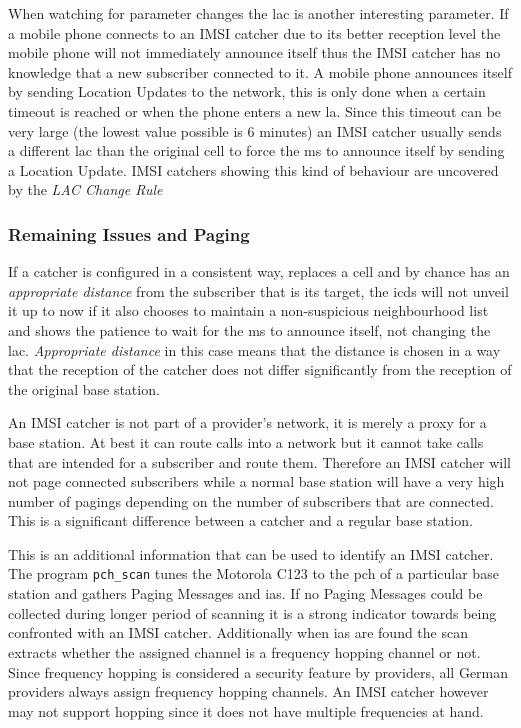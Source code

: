 When watching for parameter changes the \gls{lac} is another interesting parameter.
If a mobile phone connects to an IMSI catcher due to its better reception level the mobile phone will not immediately announce itself thus the IMSI catcher has no knowledge that a new subscriber connected to it.
A mobile phone announces itself by sending Location Updates to the network, this is only done when a certain timeout is reached or when the phone enters a new \gls{la}.
Since this timeout can be very large (the lowest value possible is 6 minutes) an IMSI catcher usually sends a different \gls{lac} than the original cell to force the \gls{ms} to announce itself by sending a Location Update.
IMSI catchers showing this kind of behaviour are uncovered by the \emph{LAC Change Rule}

\subsubsection{Remaining Issues and Paging}
\label{sec:paging}
If a catcher is configured in a consistent way, replaces a cell and by chance has an \emph{appropriate distance} from the subscriber that is its target, the \gls{icds} will not unveil it up to now if it also chooses to maintain a non-suspicious neighbourhood list and shows the patience to wait for the \gls{ms} to announce itself, \eg not changing the \gls{lac}.
\emph{Appropriate distance} in this case means that the distance is chosen in a way that the reception of the catcher does not differ significantly from the reception of the original base station.

An IMSI catcher is not part of a provider's network, it is merely a proxy for a base station.
At best it can route calls into a network but it cannot take calls that are intended for a subscriber and route them.
Therefore an IMSI catcher will not page connected subscribers while a normal base station will have a very high number of pagings depending on the number of subscribers that are connected.
This is a significant difference between a catcher and a regular base station.

This is an additional information that can be used to identify an IMSI catcher.
The program \texttt{pch\_scan} tunes the Motorola C123 to the \gls{pch} of a particular base station and gathers Paging Messages and \glspl{ia}.
If no Paging Messages could be collected during longer period of scanning it is a strong indicator towards being confronted with an IMSI catcher.
Additionally when \glspl{ia} are found the scan extracts whether the assigned channel is a frequency hopping channel or not.
Since frequency hopping is considered a security feature by providers, all German providers always assign frequency hopping channels.
An IMSI catcher however may not support hopping since it does not have multiple frequencies at hand.

